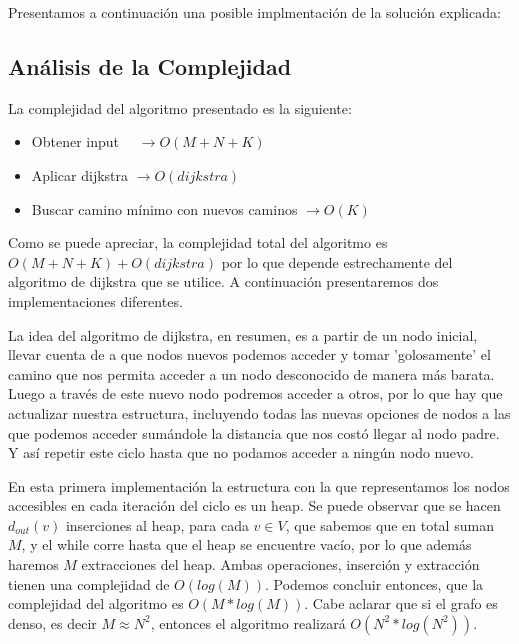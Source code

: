 Presentamos a continuación una posible implmentación de la solución explicada:



\subsection{Análisis de la Complejidad}
\vspace{1em}

La complejidad del algoritmo presentado es la siguiente: 

\begin{itemize}
    \item Obtener input \qquad \qquad \qquad \qquad \qquad \quad \quad \ \ $\rightarrow O(M + N + K)$
    \item Aplicar dijkstra \qquad \qquad \qquad \qquad \qquad \qquad $\rightarrow O(dijkstra)$
    \item Buscar camino mínimo con nuevos caminos $\rightarrow O(K)$
\end{itemize}

Como se puede apreciar, la complejidad total del algoritmo es $O(M + N + K) + O(dijkstra)$ por lo que depende estrechamente del algoritmo de dijkstra que se utilice. A continuación presentaremos dos implementaciones diferentes.

\vspace{1em}

La idea del algoritmo de dijkstra, en resumen, es a partir de un nodo inicial, llevar cuenta de a que nodos nuevos podemos acceder y tomar 'golosamente' el camino que nos permita acceder a un nodo desconocido de manera más barata. Luego a través de este nuevo nodo podremos acceder a otros, por lo que hay que actualizar nuestra estructura, incluyendo todas las nuevas opciones de nodos a las que podemos acceder sumándole la distancia que nos costó llegar al nodo padre. Y así repetir este ciclo hasta que no podamos acceder a ningún nodo nuevo. 

\pagebreak



En esta primera implementación la estructura con la que representamos los nodos accesibles en cada iteración del ciclo es un heap. 
Se puede observar que se hacen $d_{out}(v)$ inserciones al heap, para cada $v \in V$, que sabemos que en total suman $M$, y el while corre hasta que el heap se encuentre vacío, por lo que además haremos $M$ extracciones del heap. Ambas operaciones, inserción y extracción tienen una complejidad de $O(log(M))$. Podemos concluir entonces, que la complejidad del algoritmo es $O(M * log(M))$.
Cabe aclarar que si el grafo es denso, es decir $M \approx N^2$, entonces el algoritmo realizará $O(N^2 * log(N^2))$. 


